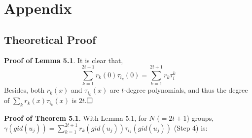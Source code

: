 \appendix
\section{Appendix}

\subsection{Theoretical Proof}

%

\textbf{Proof of Lemma 5.1}. It is clear that,
\begin{equation}
	\sum_{k=1}^{2t+1} r_k(0)\tau_{i_k}(0) = \sum_{k=1}^{2t+1} r_k\tau_i^k
\end{equation}
Besides, both $r_k(x)$ and $\tau_{i_k}(x)$ are $t$-degree polynomials, and thus the degree of $\sum_k r_k(x)\tau_{i_k}(x)$ is $2t$.$\qed$

\vspace{+.5em}

\noindent \textbf{Proof of Theorem 5.1}. With Lemma 5.1, for $N$ ($=2t+1$) groups, $\gamma(gid(u_j))
=\sum_{k=1}^{2t+1} r_k(gid(u_j)) \tau_{i_k}(gid(u_j))$ (Step 4) is:

